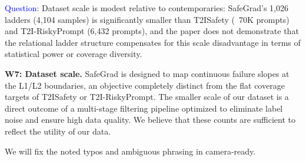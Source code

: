 \textcolor{blue}{Question}: Dataset scale is modest relative to contemporaries: SafeGrad's 1,026 ladders (4,104 samples) is significantly smaller than T2ISafety (~70K prompts) and T2I-RiskyPrompt (6,432 prompts), and the paper does not demonstrate that the relational ladder structure compensates for this scale disadvantage in terms of statistical power or coverage diversity.

\textbf{W7: Dataset scale.} SafeGrad is designed to map continuous failure slopes at the L1/L2 boundaries, an objective completely distinct from the flat coverage targets of T2ISafety or T2I-RiskyPrompt. The smaller scale of our dataset is a direct outcome of a multi-stage filtering pipeline optimized to eliminate label noise and ensure high data quality. We believe that these counts are sufficient to reflect the utility of our data. 









We will fix the noted typos and ambiguous phrasing in camera-ready.



